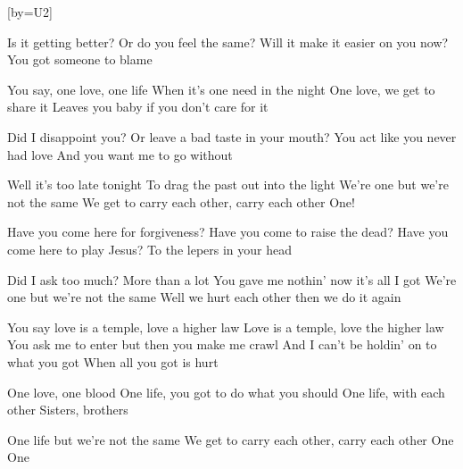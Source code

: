 [by={U2}]

  \chordsoff

  \beginverse
  Is it getting better?
  Or do you feel the same?
  Will it make it easier on you now?
  You got someone to blame
  \endverse

  \beginverse
  You say, one love, one life
  When it's one need in the night
  One love, we get to share it
  Leaves you baby if you don't care for it
  \endverse

  \beginverse
  Did I disappoint you?
  Or leave a bad taste in your mouth?
  You act like you never had love
  And you want me to go without
  \endverse

  \beginverse
  Well it's too late tonight
  To drag the past out into the light
  We're one but we're not the same
  We get to carry each other, carry each other
  One!
  \endverse

  \beginverse
  Have you come here for forgiveness?
  Have you come to raise the dead?
  Have you come here to play Jesus?
  To the lepers in your head
  \endverse

  \beginverse
  Did I ask too much? More than a lot
  You gave me nothin' now it's all I got
  We're one but we're not the same
  Well we hurt each other then we do it again
  \endverse

  \beginverse
  You say love is a temple, love a higher law
  Love is a temple, love the higher law
  You ask me to enter but then you make me crawl
  And I can't be holdin' on to what you got
  When all you got is hurt
  \endverse

  \beginverse
  One love, one blood
  One life, you got to do what you should
  One life, with each other
  Sisters, brothers
  \endverse

  \beginverse
  One life but we're not the same
  We get to carry each other, carry each other
  One
  One
  \endverse
\endsong
